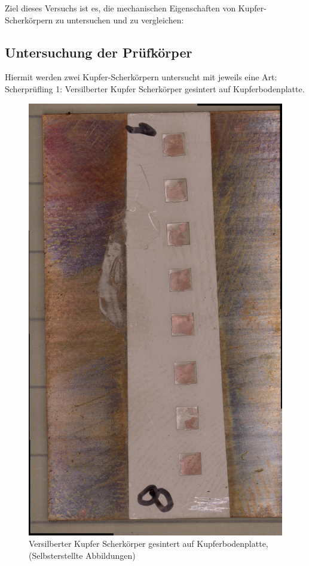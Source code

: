 Ziel dieses Versuchs ist es, die mechanischen Eigenschaften von Kupfer-Scherkörpern zu untersuchen und zu vergleichen:\\
\subsection{Untersuchung der Prüfkörper}
Hiermit werden zwei Kupfer-Scherkörpern untersucht mit jeweils eine Art:\\
Scherprüfling 1: Versilberter Kupfer Scherkörper gesintert auf Kupferbodenplatte.\\
\vspace{0.05cm}
\begin{figure}[h]
    \centering
    \includegraphics[scale=0.1, angle=90]{Bilder/Bodenplatte_Sintern_Gesamt.jpg}
    \caption{Versilberter Kupfer Scherkörper gesintert auf Kupferbodenplatte, (Selbsterstellte Abbildungen)}
    \vspace{0.2cm}
    \label{Abb.2: Versilberter Kupfer Scherkörper gesintert auf Kupferbodenplatte} 
\end{figure}\\
